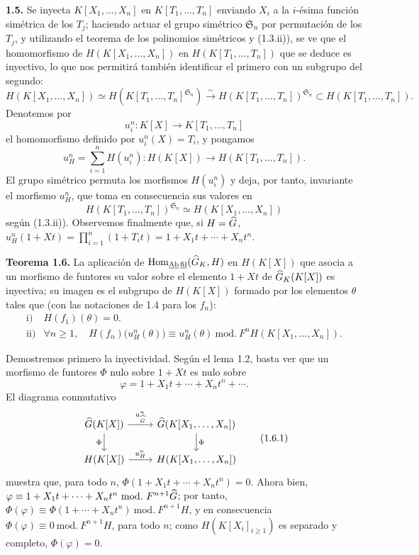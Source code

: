 \textbf{1.5.} Se inyecta \(K[X_1,\ldots,X_n]\) en \(K[T_1,\ldots,T_n]\) enviando \(X_i\) a la \(i\)-ésima función simétrica de los \(T_j\); haciendo actuar el grupo simétrico \(\mathfrak S_n\) por permutación de los \(T_j\), y utilizando el teorema de los polinomios simétricos y (1.3.ii)), se ve que el homomorfismo de \(H(K[X_1,\ldots,X_n])\) en \(H(K[T_1,\ldots,T_n])\) que se deduce es inyectivo, lo que nos permitirá también identificar el primero con un subgrupo del segundo:
\[
  H(K[X_1,\ldots,X_n])\simeq H(K[T_1,\ldots,T_n]^{\mathfrak S_n})\xrightarrow{\sim} H(K[T_1,\ldots,T_n])^{\mathfrak S_n}\subset H(K[T_1,\ldots,T_n]).
\]%
Denotemos por
\[
  u_i^n:K[X]\longrightarrow K[T_1,\ldots,T_n]
\]
el homomorfismo definido por \(u_i^n(X)=T_i\), y pongamos
\[
  u_H^n=\sum_{i=1}^n H(u_i^n):H(K[X])\longrightarrow H(K[T_1,\ldots,T_n]).
\]
El grupo simétrico permuta los morfismos \(H(u_i^n)\) y deja, por tanto, invariante el morfismo \(u_H^n\), que toma en consecuencia sus valores en
\[
  H(K[T_1,\ldots,T_n])^{\mathfrak S_n}
  \simeq H(K[X_1,\ldots,X_n])
\]
según (1.3.ii)). Observemos finalmente que, si \(H=\widehat G\), \(u_H^n(1+Xt)=\prod\limits_{i=1}^n(1+T_it)=1+X_1t+\cdots+X_nt^n\).

\textbf{Teorema 1.6.} La aplicación de \(\operatorname{Hom}_{\underline{\mathrm{Ab}}\,\underline{\mathrm{fil}}}(\widehat G_K,H)\) en \(H(K[X])\) que asocia a un morfismo de funtores su valor sobre el elemento \(1+Xt\) de \(\widehat G_K(K[X])\) es inyectiva; su imagen es el subgrupo de \(H(K[X])\) formado por los elementos \(\theta\) tales que (con las notaciones de 1.4 para los \(f_n\)):
\[
\begin{array}{ll}
\text{i)}& H(f_1)(\theta)=0.\\[0.3em]
\text{ii)}& \forall n\geq1,\quad
H(f_n)\bigl(u_H^n(\theta)\bigr)\equiv u_H^n(\theta)
\ \mathrm{mod.}\ F^nH(K[X_1,\ldots,X_n]).
\end{array}
\]

Demostremos primero la inyectividad. Según el lema 1.2, basta ver que un morfismo de funtores \(\Phi\) nulo sobre \(1+Xt\) es nulo sobre
\[
  \varphi=1+X_1t+\cdots+X_nt^n+\cdots .
\]
El diagrama conmutativo
\[
\begin{tikzcd}
\Ghat(K[X]) \arrow[r,"u^n_{\Ghat}"] \arrow[d,"\Phi"'] &
\Ghat(K[X_1,\ldots,X_n]) \arrow[d,"\Phi"]\\
H(K[X]) \arrow[r,"u_H^n"] &
H(K[X_1,\ldots,X_n])
\end{tikzcd}
\tag{1.6.1}
\]
muestra que, para todo \(n\), \(\Phi(1+X_1t+\cdots+X_nt^n)=0\). Ahora bien, \(\varphi\equiv 1+X_1t+\cdots+X_nt^n\ \mathrm{mod.}\ F^{n+1}\widehat G\); por tanto, \(\Phi(\varphi)\equiv \Phi(1+\cdots+X_nt^n)\ \mathrm{mod.}\ F^{n+1}H\), y en consecuencia \(\Phi(\varphi)\equiv0\ \mathrm{mod.}\ F^{n+1}H\), para todo \(n\); como \(H(K[X_i]_{i\geq 1})\) es separado y completo, \(\Phi(\varphi)=0\).

